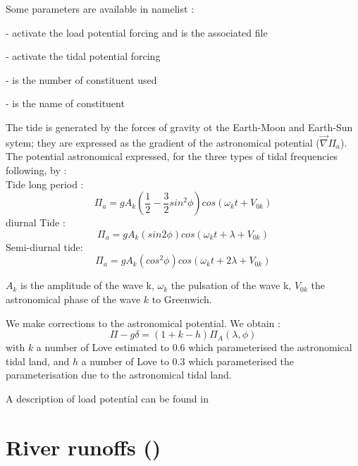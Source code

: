 \documentclass[../tex_main/NEMO_manual]{subfiles}
\begin{document}
Some parameters are available in namelist :

-  activate the load potential forcing and  is  the associated file 

-  activate the tidal potential forcing

-  is the number of constituent used

-  is the name of constituent

The tide is generated by the forces of gravity ot the Earth-Moon and Earth-Sun sytem;
they are expressed as the gradient of the astronomical potential ($\vec{\nabla}\Pi_{a}$). \\

The potential astronomical expressed, for the three types of tidal frequencies
following, by : \\
Tide long period :
\begin{equation}
\Pi_{a}=gA_{k}(\frac{1}{2}-\frac{3}{2}sin^{2}\phi)cos(\omega_{k}t+V_{0k})
\end{equation}
diurnal Tide :
\begin{equation}
\Pi_{a}=gA_{k}(sin 2\phi)cos(\omega_{k}t+\lambda+V_{0k})
\end{equation}
Semi-diurnal tide:
\begin{equation}
\Pi_{a}=gA_{k}(cos^{2}\phi)cos(\omega_{k}t+2\lambda+V_{0k})
\end{equation}


$A_{k}$ is the amplitude of the wave k, $\omega_{k}$ the pulsation of the wave k, $V_{0k}$ the astronomical phase of the wave
$k$ to Greenwich.

We make corrections to the astronomical potential.
We obtain : 
\begin{equation}
\Pi-g\delta = (1+k-h) \Pi_{A}(\lambda,\phi)
\end{equation}
with $k$ a number of Love estimated to 0.6 which parameterised the astronomical tidal land,
and $h$ a number of Love to 0.3 which parameterised the parameterisation due to the astronomical tidal land.

A description of load potential can be found in  \citet{Arbic2010}

\section{River runoffs (\protect{})}
\label{sec:SBC_rnf}
\end{document}
